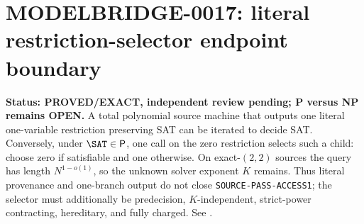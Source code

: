 \section{MODELBRIDGE-0017: literal restriction-selector endpoint boundary}
\textbf{Status: PROVED/EXACT, independent review pending; P versus NP remains OPEN.}
A total polynomial source machine that outputs one literal one-variable
restriction preserving SAT can be iterated to decide SAT.  Conversely, under
$\SAT\in\mathsf P$, one call on the zero restriction selects such a child:
choose zero if satisfiable and one otherwise.  On exact-$(2,2)$ sources the
query has length $N^{1-o(1)}$, so the unknown solver exponent $K$ remains.
Thus literal provenance and one-branch output do not close
\texttt{SOURCE-PASS-ACCESS1}; the selector must additionally be predecision,
$K$-independent, strict-power contracting, hereditary, and fully charged.
See .
